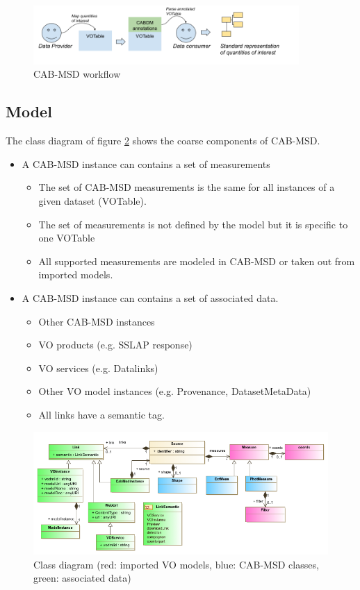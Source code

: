 \documentclass[11pt,a4paper]{ivoa}
\begin{document}
\begin{figure}
\centering
\includegraphics[width=0.9\textwidth]{fig1.png}
\caption{CAB-MSD workflow}
\label{fig:workflow}
\end{figure}


\subsection{Model}

The class diagram of figure \ref{fig:classdiag} shows the coarse components of CAB-MSD. 

\begin{itemize}
    \item A CAB-MSD instance can contains a set of measurements
    \begin{itemize}
        \item The set of CAB-MSD measurements is the same for all instances of a given dataset (VOTable).
        \item The set of measurements is not defined by the model but it is specific to one VOTable
        \item All supported measurements are modeled in CAB-MSD or taken out from imported models.
    \end{itemize}
\item A CAB-MSD instance can contains a set of associated data.
    \begin{itemize}
        \item Other CAB-MSD instances
        \item VO products (e.g. SSLAP response)
        \item VO services (e.g. Datalinks)
        \item Other VO model instances (e.g. Provenance, DatasetMetaData)
        \item All links have a semantic tag.
    \end{itemize}
\end{itemize}


\begin{figure}
\centering
\includegraphics[width=1.0\textwidth]{CABSDM_diagram.png}
\caption{Class diagram (red: imported VO models, blue: CAB-MSD classes, green: associated data)}
\label{fig:classdiag}
\end{figure}
\end{document}

